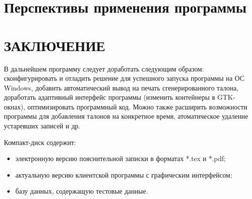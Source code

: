 \clearpage
\section{Перспективы применения программы}
\setcounter{figure}{0}


% 
% 
% 



\newpage
\section*{ЗАКЛЮЧЕНИЕ}
В дальнейшем программу следует доработать следующим образом:
сконфигурировать и отладить решение для успешного запуска программы на ОС Windows, добавить автоматический вывод на печать сгенерированного талона, доработать адаптивный интерфейс программы (изменить контейнеры в GTK-окнах), оптимизировать программный код. Можно также расширить возможности программы для добавления талонов на конкретное время, атоматическое удаление устаревших записей и др.

\newpage
\renewcommand{\refname}{Список использованных источников}


Компакт-диск содержит: 
\begin{itemize}
\item электронную версию пояснительной записки в форматах *.tex и *.pdf;
\item актуальную версию клиентской программы с графическим интерфейсом;
\item базу данных, содержащую тестовые данные.
\end{itemize}


